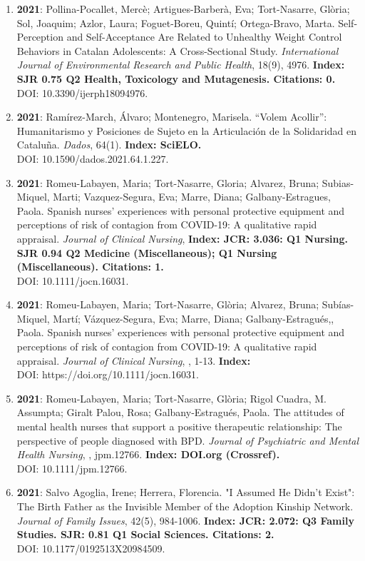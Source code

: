 \begin{enumerate}
\item {\bf 2021}: Pollina-Pocallet, Mercè; Artigues-Barberà, Eva; Tort-Nasarre, Glòria; Sol, Joaquim; Azlor, Laura; Foguet-Boreu, Quintí; Ortega-Bravo, Marta.  Self-Perception and Self-Acceptance Are Related to Unhealthy Weight Control Behaviors in Catalan Adolescents: A Cross-Sectional Study. {\it International Journal of Environmental Research and Public Health}, 18(9), 4976. {\bf Index: SJR 0.75 Q2 Health, Toxicology and Mutagenesis. Citations: 0. } \\ DOI: 10.3390/ijerph18094976. \filbreak
\item {\bf 2021}: Ramírez-March, Álvaro; Montenegro, Marisela.  “Volem Acollir”: Humanitarismo y Posiciones de Sujeto en la Articulación de la Solidaridad en Cataluña. {\it Dados}, 64(1). {\bf Index: SciELO. } \\ DOI: 10.1590/dados.2021.64.1.227. \filbreak
\item {\bf 2021}: Romeu-Labayen, Maria; Tort-Nasarre, Gloria; Alvarez, Bruna; Subias-Miquel, Marti; Vazquez-Segura, Eva; Marre, Diana; Galbany-Estragues, Paola.  Spanish nurses' experiences with personal protective equipment and perceptions of risk of contagion from COVID-19: A qualitative rapid appraisal. {\it Journal of Clinical Nursing}, {\bf Index: JCR: 3.036: Q1 Nursing.  SJR 0.94 Q2 Medicine (Miscellaneous); Q1 Nursing (Miscellaneous). Citations: 1. } \\ DOI: 10.1111/jocn.16031. \filbreak
\item {\bf 2021}: Romeu-Labayen, Maria; Tort-Nasarre, Glòria; Alvarez, Bruna; Subías-Miquel, Martí; Vázquez-Segura, Eva; Marre, Diana; Galbany-Estragués,, Paola.  Spanish nurses’ experiences with personal protective equipment and perceptions of risk of contagion from COVID-19: A qualitative rapid appraisal. {\it Journal of Clinical Nursing}, , 1-13. {\bf Index: } \\ DOI: https://doi.org/10.1111/jocn.16031. \filbreak
\item {\bf 2021}: Romeu‐Labayen, Maria; Tort‐Nasarre, Glòria; Rigol Cuadra, M. Assumpta; Giralt Palou, Rosa; Galbany‐Estragués, Paola.  The attitudes of mental health nurses that support a positive therapeutic relationship: The perspective of people diagnosed with BPD. {\it Journal of Psychiatric and Mental Health Nursing}, , jpm.12766. {\bf Index: DOI.org (Crossref). } \\ DOI: 10.1111/jpm.12766. \filbreak
\item {\bf 2021}: Salvo Agoglia, Irene; Herrera, Florencia.  "I Assumed He Didn't Exist": The Birth Father as the Invisible Member of the Adoption Kinship Network. {\it Journal of Family Issues}, 42(5), 984-1006. {\bf Index: JCR: 2.072: Q3 Family Studies.  SJR: 0.81 Q1 Social Sciences. Citations: 2. } \\ DOI: 10.1177/0192513X20984509. \filbreak

\end{enumerate}
